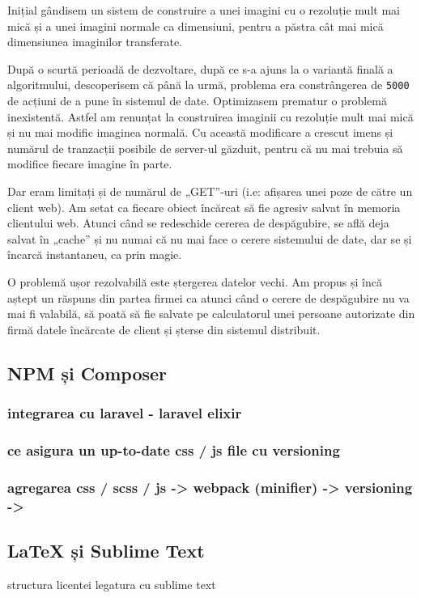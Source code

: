 		Inițial gândisem un sistem de construire a unei imagini cu o rezoluție mult mai mică și a unei imagini normale ca dimensiuni, pentru a păstra cât mai mică dimensiunea imaginilor transferate.

		După o scurtă perioadă de dezvoltare, după ce s-a ajuns la o variantă finală a algoritmului, descoperisem că până la urmă, problema era constrângerea de \verb|5000| de acțiuni de a pune în sistemul de date.
		Optimizasem prematur o problemă inexistentă.
		Astfel am renunțat la construirea imaginii cu rezoluție mult mai mică și nu mai modific imaginea normală.
		Cu această modificare a crescut imens și numărul de tranzacții posibile de server-ul găzduit, pentru că nu mai trebuia să modifice fiecare imagine în parte.

		Dar eram limitați și de numărul de „GET”-uri (i.e: afișarea unei poze de către un client web).
		Am setat ca fiecare obiect încărcat să fie agresiv salvat în memoria clientului web.
		Atunci când se redeschide cererea de despăgubire, se află deja salvat în „cache” și nu numai că nu mai face o cerere sistemului de date, dar se și încarcă instantaneu, ca prin magie.

		O problemă ușor rezolvabilă este ștergerea datelor vechi.
		Am propus și încă aștept un răspuns din partea firmei ca atunci când o cerere de despăgubire nu va mai fi valabilă, să poată să fie salvate pe calculatorul unei persoane autorizate din firmă datele încărcate de client și șterse din sistemul distribuit.

	\subsection{NPM și Composer}
		\subsubsection{integrarea cu laravel - laravel elixir}
		\subsubsection{ce asigura un up-to-date css / js file cu versioning}
		\subsubsection{agregarea css / scss / js -> webpack (minifier) -> versioning ->}
	\subsection{LaTeX și Sublime Text}
		structura licentei
		legatura cu sublime text
